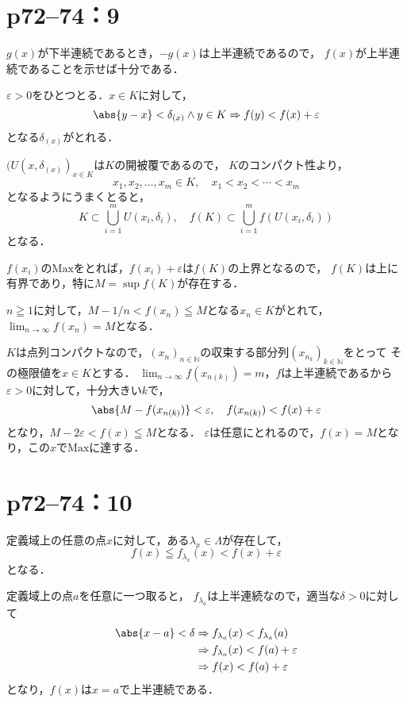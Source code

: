 \newpage

\section*{p72--74：9}

\begin{tproof}
    $g(x)$が下半連続であるとき，$-g(x)$は上半連続であるので，
    $f(x)$が上半連続であることを示せば十分である．

    $\varepsilon >0$をひとつとる．$ x\in K$に対して，
    \[
        \abs{y-x} < \delta_{(x)} \land y \in K \Rightarrow f(y) < f(x) + \varepsilon
    \]
    となる$\delta_{(x)}$がとれる．

    $(U(x,\delta_{(x)})_{x\in K}$は$K$の開被覆であるので，
    $K$のコンパクト性より，
    \[
        x_1 , x_2, \ldots , x_m \in K , \quad x_1 < x_2 < \cdots < x_m
    \]
    となるようにうまくとると，
    \[
        K \subset \bigcup_{i=1}^m U(x_i,\delta_i) ,\quad f(K) \subset \bigcup_{i=1}^m f(U(x_i,\delta_i))
    \]
    となる．

    $f(x_i)$の$\mathrm{Max}$をとれば，$f(x_i)+\varepsilon$は$f(K)$の上界となるので，
    $f(K)$は上に有界であり，特に$M = \sup f(K)$が存在する．

    $n \geqq 1$に対して，$ M - 1/n < f(x_n) \leqq M$となる$x_n \in K$がとれて，
    $\lim_{n \to \infty} f(x_n) = M$となる．

    $K$は点列コンパクトなので，$(x_n)_{n \in \mathbb{N}}$の収束する部分列$(x_{n_k})_{k \in \mathbb{N}}$をとって
    その極限値を$ x\in K$とする．
    $\lim_{n \to \infty} f(x_{n(k)})=m$，$f$は上半連続であるから
    $\varepsilon >0$に対して，十分大きい$k$で，
    \[
        \abs{M-f(x_{n(k)})} < \varepsilon,\quad f(x_{n(k)})<f(x)+\varepsilon
    \]
    となり，$M-2 \varepsilon < f(x) \leqq M $となる．
    $\varepsilon$は任意にとれるので，$f(x) = M$となり，この$x$で$\mathrm{Max}$に達する．
\end{tproof}


\section*{p72--74：10}

\begin{tproof}
    定義域上の任意の点$x$に対して，ある$ \lambda_x \in \Lambda$が存在して，
    \[
        f(x) \leqq f_{\lambda_x} (x) < f(x) + \varepsilon
    \]
    となる．

    定義域上の点$a$を任意に一つ取ると，
    $f_{\lambda_a}$は上半連続なので，適当な$\delta >0$に対して
    \begin{align*}
        \abs{x-a}<\delta & \Rightarrow f_{\lambda_a}(x) < f_{\lambda_a}(a)     \\
                         & \Rightarrow  f_{\lambda_a}(x) < f (a) + \varepsilon \\
                         & \Rightarrow f(x) < f(a) + \varepsilon
    \end{align*}
    となり，$f(x)$は$x=a$で上半連続である．
\end{tproof}


